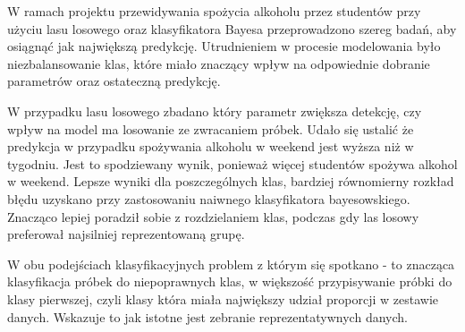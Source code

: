 W ramach projektu przewidywania spożycia alkoholu przez studentów przy użyciu lasu losowego oraz klasyfikatora Bayesa przeprowadzono szereg badań, aby osiągnąć jak największą predykcję. Utrudnieniem w procesie modelowania było niezbalansowanie klas, które miało znaczący wpływ na odpowiednie dobranie parametrów oraz ostateczną predykcję.

W przypadku lasu losowego zbadano który parametr zwiększa detekcję, czy wpływ na model ma losowanie ze zwracaniem próbek. Udało się ustalić że predykcja w przypadku spożywania alkoholu w weekend jest wyższa niż w tygodniu. Jest to spodziewany wynik, ponieważ więcej studentów spożywa alkohol w weekend. Lepsze wyniki dla poszczególnych klas, bardziej równomierny rozkład błędu uzyskano przy zastosowaniu naiwnego klasyfikatora bayesowskiego. Znacząco lepiej poradził sobie z rozdzielaniem klas, podczas gdy las losowy preferował najsilniej reprezentowaną grupę.

W obu podejściach klasyfikacyjnych problem z którym się spotkano - to znacząca klasyfikacja próbek do niepoprawnych klas, w większość przypisywanie próbki do klasy pierwszej, czyli klasy która miała największy udział proporcji w zestawie danych. Wskazuje to jak istotne jest zebranie reprezentatywnych danych.
